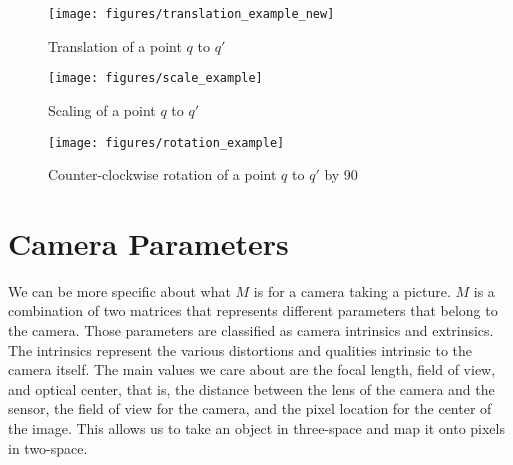 \documentclass[
    12pt,
    twoside,
    bibstyle=chicago,
    headerstyle=uppercase,
	bibfile=biblatex_updating.bib
]{reedthesis}
\begin{document}
\begin{figure}[p]
	   
        \centering
        \texttt{[image: figures/translation\_example\_new]}
        \caption{Translation of a point $q$ to $q'$}    \label{fig:Translation Representation}
        \bigskip%
        \texttt{[image: figures/scale\_example]}
        \caption{Scaling of a point $q$ to $q'$}    \label{fig:Scale Representation}
        \bigskip
        \texttt{[image: figures/rotation\_example]}
        \caption{Counter-clockwise rotation of a point $q$ to $q'$ by 90\degree}    \label{fig:Rotation Representation}

\end{figure}
	

\section{Camera Parameters}

We can be more specific about what $M$ is for a camera taking a picture. $M$ is a combination of two matrices that represents different parameters that belong to the camera. Those parameters are classified as camera intrinsics and extrinsics. The intrinsics represent the various distortions and qualities intrinsic to the camera itself. The main values we care about are the focal length, field of view, and optical center, that is, the distance between the lens of the camera and the sensor, the field of view for the camera, and the pixel location for the center of the image. This allows us to take an object in three-space and map it onto pixels in two-space. 

\end{document}
